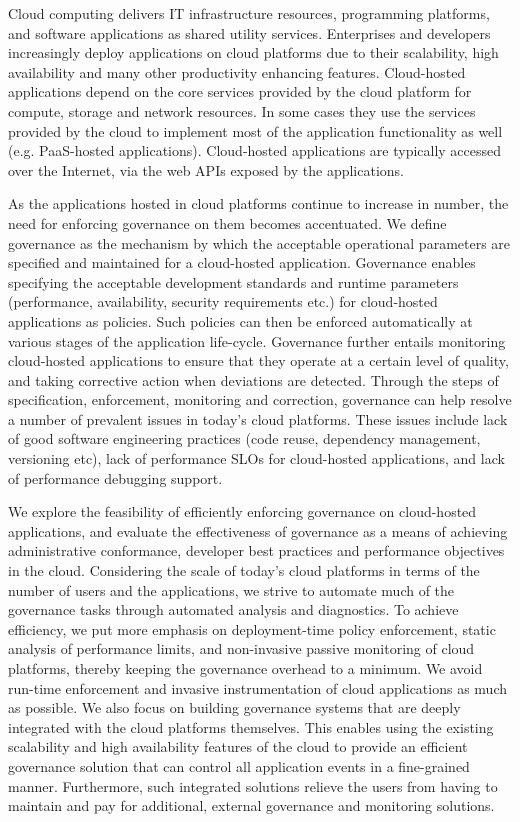 Cloud computing delivers IT infrastructure resources, programming platforms, and software
applications as shared utility services. Enterprises and developers increasingly deploy applications 
on cloud platforms due to their scalability, high availability and many other
productivity enhancing features. Cloud-hosted applications depend on the core services provided
by the cloud platform for compute, storage and network resources. 
In some cases they use the services provided by the cloud to implement most of
the application functionality as well (e.g. PaaS-hosted applications). 
Cloud-hosted applications are typically
accessed over the Internet, via the web APIs exposed by the applications.

As the applications hosted in cloud platforms continue to increase in number, the need for enforcing
governance on them becomes accentuated. We define governance as the mechanism by which the 
acceptable operational parameters are specified and maintained for a cloud-hosted application.
Governance enables specifying the acceptable
development standards and runtime parameters (performance, availability, security requirements etc.) 
for cloud-hosted applications as policies. Such
policies can then be enforced automatically at various stages of the application life-cycle. 
Governance further entails
monitoring cloud-hosted applications to ensure that they operate at a certain level of quality,
and taking corrective action when deviations are detected. Through the steps of specification,
enforcement, monitoring and correction, governance can help resolve a number of prevalent issues in
today's cloud platforms. These issues include lack of good software engineering practices (code reuse,
dependency management, versioning etc), lack of performance SLOs for cloud-hosted applications,
and lack of performance debugging support. 

We explore the feasibility of efficiently enforcing governance on cloud-hosted
applications, and evaluate the effectiveness of governance as a means of achieving administrative
conformance, developer best practices and performance objectives in the cloud. Considering the scale of
today's cloud platforms in terms of the number of users and the applications, 
we strive to automate much of the governance tasks through
automated analysis and diagnostics. To achieve efficiency, we put more emphasis on deployment-time
policy enforcement, static analysis of performance limits, and non-invasive passive monitoring of 
cloud platforms, thereby keeping the governance overhead
to a minimum. We avoid run-time enforcement and invasive instrumentation of cloud applications 
as much as possible. We also focus on building governance systems that are deeply integrated with
the cloud platforms themselves. This enables using the existing scalability and high availability features of the cloud
to provide an efficient governance solution that can control all application events in a fine-grained
manner. Furthermore, such integrated solutions relieve the users from having to maintain and pay
for additional, external governance and monitoring solutions.

